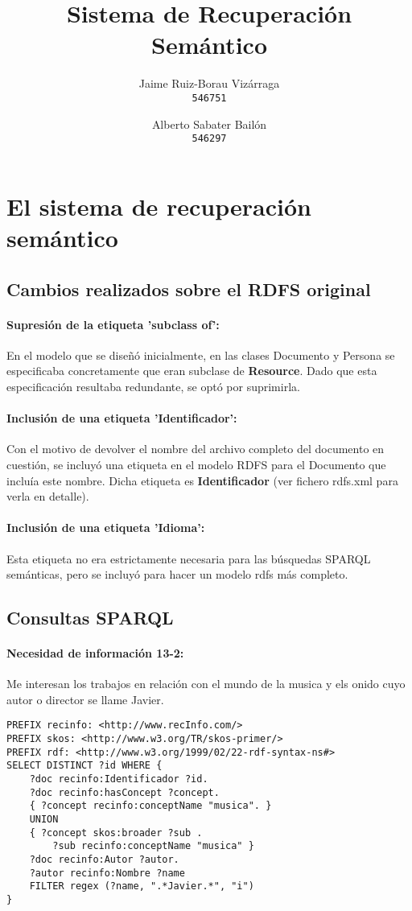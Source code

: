 \documentclass[a4paper]{article}
\begin{document}
\title{Sistema de Recuperación Semántico}
\author{
	Jaime Ruiz-Borau Vizárraga\\
	\texttt{546751}
	\and
	Alberto Sabater Bailón\\
	\texttt{546297}
	}
\date{}
\maketitle

\section{El sistema de recuperación semántico}
\subsection{Cambios realizados sobre el RDFS original}
\paragraph{Supresión de la etiqueta 'subclass of':}En el modelo que se diseñó inicialmente, en las clases Documento y Persona se especificaba concretamente que eran subclase de \textbf{Resource}. Dado que esta especificación resultaba redundante, se optó por suprimirla.
\paragraph{Inclusión de una etiqueta 'Identificador':}Con el motivo de devolver el nombre del archivo completo del documento en cuestión, se incluyó una etiqueta en el modelo RDFS para el Documento que incluía este nombre. Dicha etiqueta es \textbf{Identificador} (ver fichero rdfs.xml para verla en detalle).
\paragraph{Inclusión de una etiqueta 'Idioma':}Esta etiqueta no era estrictamente necesaria para las búsquedas SPARQL semánticas, pero se incluyó para hacer un modelo rdfs más completo.
\subsection{Consultas SPARQL}
\paragraph{Necesidad de información 13-2:}Me interesan los trabajos en relación con el mundo de la musica y els onido cuyo autor o director se llame Javier.
\newline
\begin{lstlisting}[captionpos=b, caption=Consulta SPARQL para la necesidad de información 13-2, label=lst:sparql,
basicstyle=\ttfamily,frame=single]
PREFIX recinfo: <http://www.recInfo.com/>
PREFIX skos: <http://www.w3.org/TR/skos-primer/>
PREFIX rdf: <http://www.w3.org/1999/02/22-rdf-syntax-ns#>
SELECT DISTINCT ?id WHERE {
	?doc recinfo:Identificador ?id.
	?doc recinfo:hasConcept ?concept.
	{ ?concept recinfo:conceptName "musica". }
	UNION
	{ ?concept skos:broader ?sub .
		?sub recinfo:conceptName "musica" }
	?doc recinfo:Autor ?autor.
	?autor recinfo:Nombre ?name
	FILTER regex (?name, ".*Javier.*", "i")
}
\end{lstlisting}
\newpage
\end{document}

